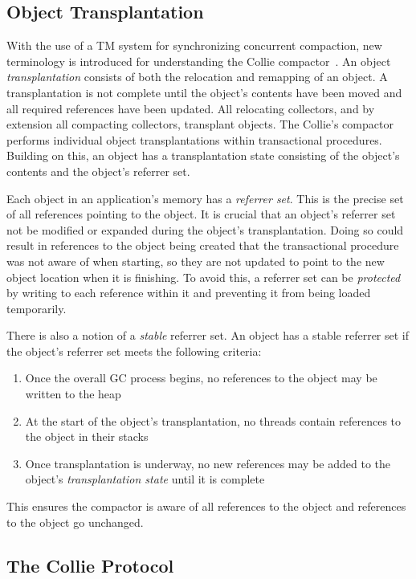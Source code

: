 \documentclass{sig-alternate}
\begin{document}
\subsection{Object Transplantation}
\label{sec:collieTransplantation}

With the use of a TM system for synchronizing concurrent compaction,
new terminology is introduced for understanding the Collie 
compactor~\cite{Iyengar:Collie}. 
An object \emph{transplantation} consists of both the relocation and 
remapping of an object. A transplantation is not complete until
the object's contents have been moved and all required references have been
updated. All relocating collectors, and by extension all
compacting collectors, transplant objects. The Collie's compactor 
performs individual object transplantations within transactional procedures. 
Building on this, an object has a transplantation state consisting of the object's contents 
and the object's referrer set.

Each object in an application's memory has a \emph{referrer set}. This is the precise set 
of all references pointing to the object. It is crucial that an object's referrer set not
be modified or expanded during the object's transplantation. Doing so could result
in references to the object being created that the transactional procedure
was not aware of when starting, so they are not updated to point to 
the new object location when it is finishing. To avoid this, a referrer set can be
\emph{protected} by writing to each reference within it and preventing it from
being loaded temporarily.

There is also a notion of a \emph{stable} referrer set. An object has a stable referrer 
set if the object's referrer set meets the following criteria:
\begin{enumerate}
\item Once the overall GC process begins, no references to the object may be written to the heap
\item At the start of the object's transplantation, no threads contain references to the object in their stacks
\item Once transplantation is underway, no new references may be added to the object's \emph{transplantation state} until it is complete
\end{enumerate}
This ensures the compactor is aware of all references to the object
and references to the object go unchanged.


\subsection{The Collie Protocol}
\label{sec:collieAlgorithm}
\end{document}
